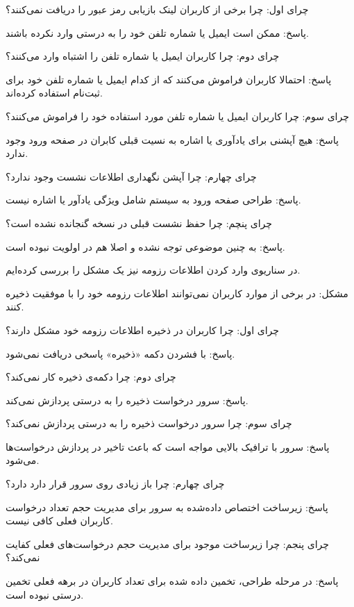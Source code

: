 \documentclass[]{article}
\begin{document}
	چرای اول: چرا برخی از کاربران لینک بازیابی رمز عبور را دریافت نمی‌کنند؟
	
	پاسخ: ممکن است ایمیل یا شماره تلفن خود را به درستی وارد نکرده باشند.
	
	چرای دوم: چرا کاربران ایمیل یا شماره تلفن را اشتباه وارد می‌کنند؟
	
	پاسخ: احتمالا کاربران فراموش می‌کنند که از کدام ایمیل یا شماره تلفن خود برای ثبت‌نام استفاده کرده‌اند.
	
	چرای سوم: چرا کاربران ایمیل یا شماره تلفن مورد استفاده خود را فراموش می‌کنند؟
	
	پاسخ: هیچ آپشنی برای یادآوری یا اشاره به نسیت قبلی کابران در صفحه ورود وجود ندارد.
	
	چرای چهارم: چرا آپشن نگهداری اطلاعات نشست وجود ندارد؟
	
	پاسخ: طراحی صفحه ورود به سیستم شامل ویژگی یادآور یا اشاره نیست.
	
	چرای پنچم: چرا حفظ نشست قبلی در نسخه گنجانده نشده است؟
	
	پاسخ: به چنین موضوعی توجه نشده و اصلا هم در اولویت نبوده است.
	
	
	در سناریوی وارد کردن اطلاعات رزومه نیز یک مشکل را بررسی کرده‌ایم.
	
	مشکل: در برخی از موارد کاربران نمی‌توانند اطلاعات رزومه خود را با موفقیت ذخیره کنند.
	
	چرای اول: چرا کاربران در ذخیره اطلاعات رزومه خود مشکل دارند؟
	
	پاسخ: با فشردن دکمه «ذخیره» پاسخی دریافت نمی‌شود.
	
	چرای دوم: چرا دکمه‌ی ذخیره کار نمی‌کند؟
	
	پاسخ: سرور درخواست ذخیره را به درستی پردازش نمی‌کند.
	
	چرای سوم: چرا سرور درخواست ذخیره را به درستی پردازش نمی‌کند؟
	
	پاسخ: سرور با ترافیک بالایی مواجه است که باعث تاخیر در پردازش درخواست‌ها می‌شود.
	
	چرای چهارم: چرا باز زیادی روی سرور قرار دارد دارد؟
	
	پاسخ: زیرساخت اختصاص داده‌شده به سرور برای مدیریت حجم تعداد درخواست کاربران فعلی کافی نیست.
	
	چرای پنجم: چرا زیرساخت موجود برای مدیریت حجم درخواست‌های فعلی کفایت نمی‌کند؟
	
	پاسخ: در مرحله طراحی، تخمین داده شده برای تعداد کاربران در برهه فعلی تخمین درستی نبوده است.
	
\end{document}
